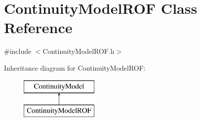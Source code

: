 \hypertarget{classContinuityModelROF}{}\section{Continuity\+Model\+R\+OF Class Reference}
\label{classContinuityModelROF}


{\ttfamily \#include $<$Continuity\+Model\+R\+O\+F.\+h$>$}

Inheritance diagram for Continuity\+Model\+R\+OF\+:\begin{figure}[H]
\begin{center}
\leavevmode
\includegraphics[height=2.000000cm]{classContinuityModelROF}
\end{center}
\end{figure}
